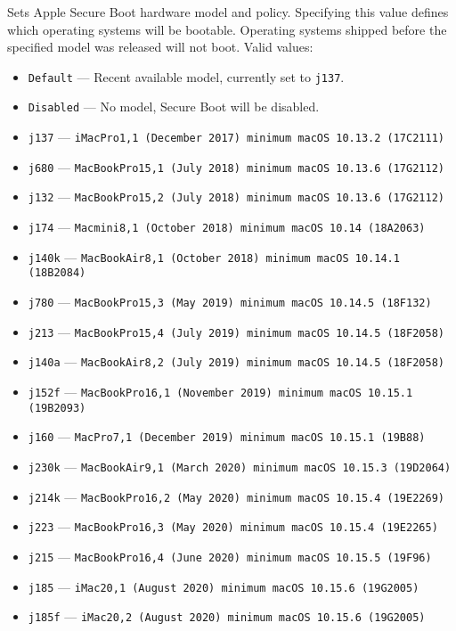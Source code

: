 \documentclass[]{article}
\providecommand{\tightlist}{%
  \setlength{\itemsep}{0pt}\setlength{\parskip}{0pt}}
\begin{document}
\begin{enumerate}
  Sets Apple Secure Boot hardware model and policy. Specifying
  this value defines which operating systems will be bootable.
  Operating systems shipped before the specified model was released
  will not boot. Valid values:

  \begin{itemize}
  \tightlist
  \item \texttt{Default} --- Recent available model, currently set to \texttt{j137}.
  \item \texttt{Disabled} --- No model, Secure Boot will be disabled.
  \item \texttt{j137} --- \texttt{iMacPro1,1 (December 2017) minimum macOS 10.13.2 (17C2111)}
  \item \texttt{j680} --- \texttt{MacBookPro15,1 (July 2018) minimum macOS 10.13.6 (17G2112)}
  \item \texttt{j132} --- \texttt{MacBookPro15,2 (July 2018) minimum macOS 10.13.6 (17G2112)}
  \item \texttt{j174} --- \texttt{Macmini8,1 (October 2018) minimum macOS 10.14 (18A2063)}
  \item \texttt{j140k} --- \texttt{MacBookAir8,1 (October 2018) minimum macOS 10.14.1 (18B2084)}
  \item \texttt{j780} --- \texttt{MacBookPro15,3 (May 2019)  minimum macOS 10.14.5 (18F132)}
  \item \texttt{j213} --- \texttt{MacBookPro15,4 (July 2019) minimum macOS 10.14.5 (18F2058)}
  \item \texttt{j140a} --- \texttt{MacBookAir8,2 (July 2019) minimum macOS 10.14.5 (18F2058)}
  \item \texttt{j152f} --- \texttt{MacBookPro16,1 (November 2019) minimum macOS 10.15.1 (19B2093)}
  \item \texttt{j160} --- \texttt{MacPro7,1 (December 2019) minimum macOS 10.15.1 (19B88)}
  \item \texttt{j230k} --- \texttt{MacBookAir9,1 (March 2020) minimum macOS 10.15.3 (19D2064)}
  \item \texttt{j214k} --- \texttt{MacBookPro16,2 (May 2020) minimum macOS 10.15.4 (19E2269)}
  \item \texttt{j223} --- \texttt{MacBookPro16,3 (May 2020) minimum macOS 10.15.4 (19E2265)}
  \item \texttt{j215} --- \texttt{MacBookPro16,4 (June 2020) minimum macOS 10.15.5 (19F96)}
  \item \texttt{j185} --- \texttt{iMac20,1 (August 2020) minimum macOS 10.15.6 (19G2005)}
  \item \texttt{j185f} --- \texttt{iMac20,2 (August 2020) minimum macOS 10.15.6 (19G2005)}
  \end{itemize}


\end{enumerate}
\end{document}
